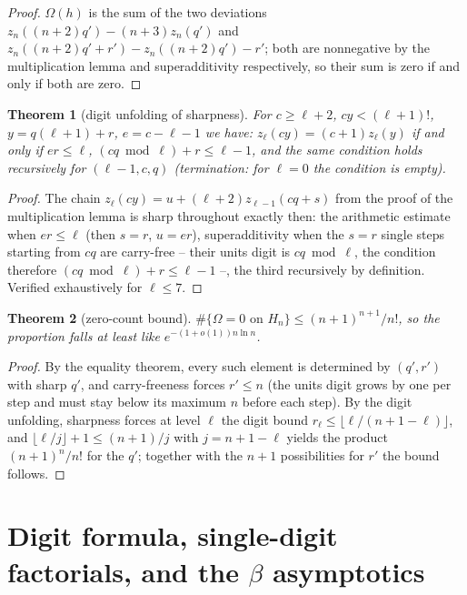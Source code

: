 \documentclass[11pt]{article}
\newtheorem{satz}{Theorem}[section]
\theoremstyle{definition}
\theoremstyle{remark}
\begin{document}
\begin{proof}
$\Omega(h)$ is the sum of the two deviations
$z_n((n{+}2)q')-(n{+}3)z_n(q')$ and
$z_n((n{+}2)q'+r')-z_n((n{+}2)q')-r'$; both are nonnegative by
the multiplication lemma and superadditivity respectively, so
their sum is zero if and only if both are zero.
\end{proof}

\begin{satz}[digit unfolding of sharpness]
For $c\ge\ell+2$, $cy<(\ell+1)!$, $y=q(\ell+1)+r$, $e=c-\ell-1$
we have: $z_\ell(cy)=(c{+}1)z_\ell(y)$ if and only if $er\le\ell$,
$(cq\bmod\ell)+r\le\ell-1$, and the same condition holds
recursively for
$(\ell{-}1,c,q)$ (termination: for $\ell=0$ the condition is
empty).
\end{satz}

\begin{proof}
The chain $z_\ell(cy)=u+(\ell+2)z_{\ell-1}(cq+s)$ from the proof
of the multiplication lemma is sharp throughout exactly then: the
arithmetic estimate when $er\le\ell$ (then $s=r$, $u=er$),
superadditivity when the $s=r$ single steps starting from $cq$
are carry-free -- their units digit is $cq\bmod\ell$, the
condition therefore $(cq\bmod\ell)+r\le\ell-1$ --, the third
recursively by definition. Verified exhaustively for $\ell\le7$.
\end{proof}

\begin{satz}[zero-count bound]
$\#\{\Omega=0\text{ on }H_n\}\le(n{+}1)^{n+1}/n!$, so the
proportion falls at least like $e^{-(1+o(1))n\ln n}$.
\end{satz}

\begin{proof}
By the equality theorem, every such element is determined by
$(q',r')$ with sharp $q'$, and carry-freeness forces
$r'\le n$ (the units digit grows by one per step and must stay
below its maximum $n$ before each step). By the digit unfolding,
sharpness forces at level $\ell$ the
digit bound $r_\ell\le\lfloor\ell/(n{+}1{-}\ell)\rfloor$, and
$\lfloor\ell/j\rfloor+1\le(n{+}1)/j$ with $j=n{+}1{-}\ell$ yields
the product $(n{+}1)^n/n!$ for the $q'$; together with the
$n{+}1$ possibilities for $r'$ the bound follows.
\end{proof}


\section{Digit formula, single-digit factorials, and the
$\beta$ asymptotics}\label{app:beta}
\end{document}
